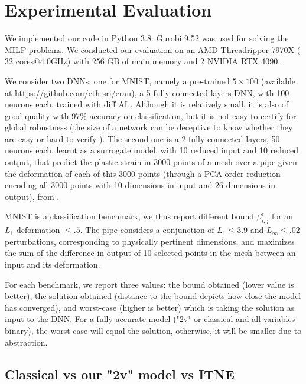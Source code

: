 	\section{Experimental Evaluation}
	
	We implemented our code in Python 3.8.
	Gurobi 9.52 was used for solving the MILP problems. We conducted our evaluation on an AMD Threadripper 7970X ($32$ cores$@4.0$GHz) with 256 GB of main memory and 2 NVIDIA RTX 4090. 
	
	We consider two DNNs: one for MNIST, namely a pre-trained $5\times 100$ (available at \url{https://github.com/eth-sri/eran}), a 5 fully connected layers DNN, with 100 neurons each,	trained with diff AI \cite{deeppoly}. 
	Although it is relatively small, it is also of good quality with $97\%$ accuracy on classification, but it is not easy to certify for global robustness (the size of a network can be deceptive to know whether they are easy or hard to verify \cite{ATVA25}).  
	The second one is a 2 fully connected layers, 50 neurons each, learnt as a surrogate model, with 10 reduced input and 10 reduced output, that predict the plastic strain in 3000 points of a mesh over a pipe given the deformation of each of this 3000 points (through a PCA order reduction encoding all 3000 points with 10 dimensions in input and 26 dimensions in output), from \cite{aiware}.
	
	MNIST is a classification benchmark, we thus report different bound $\beta^{\epsilon}_{i,j}$
	for an $L_1$-deformation $\leq .5$. The pipe considers a conjunction of 
	$L_1 \leq 3.9$ and $L_\infty \leq .02$ perturbations, corresponding to physically pertinent dimensions, and maximizes the sum of the difference in output of 10 selected points in the mesh between an input and its deformation.

For each benchmark, we report three values: the bound obtained (lower value is better),
the solution obtained (distance to the bound depicts how close the model has converged),
and worst-case (higher is better) which is taking the solution as input to the DNN. For a fully accurate model ("2v" or classical and all variables binary),
the worst-case will equal the solution, otherwise, it will be smaller due to abstraction.

\subsection{Classical vs our "2v" model vs ITNE}


